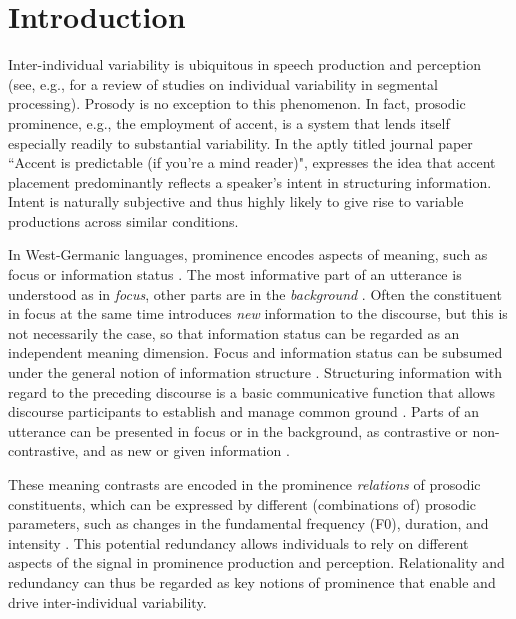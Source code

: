 \chapter{Introduction}

Inter-individual variability is ubiquitous in speech production and perception (see, e.g., \citealt{yuIndividualDifferencesLanguage2019} for a review of studies on individual variability in segmental processing). Prosody is no exception to this phenomenon. In fact, prosodic prominence, e.g., the employment of accent, is a system that lends itself especially readily to substantial variability. In the aptly titled journal paper ``Accent is predictable (if you're a mind reader)", \citet{bolingerAccentPredictableIf1972} expresses the idea that accent placement predominantly reflects a speaker's intent in structuring information.
Intent is naturally subjective and thus highly likely to give rise to variable productions across similar conditions. 
 
In West-Germanic languages, prominence encodes aspects of meaning, such as focus or information status \citep{buringSemanticsIntonationInformation2007, feryPitchAccentScaling2008, baumannCoreferenceLexicalGivenness2013, coleProsodyContextReview2015}. The most informative part of an utterance is understood as in \textit{focus}, other parts are in the \textit{background} \citep{buringSemanticsIntonationInformation2007}. Often the constituent in focus at the same time introduces \textit{new} information to the discourse, but this is not necessarily the case, so that information status can be regarded as an independent meaning dimension. Focus and information status can be subsumed under the general notion of information structure \citep{hallidayNotesTransitivityTheme1967}. Structuring information with regard to the preceding discourse is a basic communicative function that allows discourse participants to establish and manage common ground \citep{krifkaBasicNotionsInformation2008}. Parts of an utterance can be presented in focus or in the background, as contrastive or non-contrastive, and as new or given information \citep{buringSemanticsIntonationInformation2007}.

These meaning contrasts are encoded in the prominence \textit{relations} of prosodic constituents, which can be expressed by different (combinations of) prosodic parameters, such as changes in the fundamental frequency (F0), duration, and intensity \citep{fryDurationIntensityPhysical1955, sluijterSpectralBalanceAcoustic1996, kochanskiLoudnessPredictsProminence2005, baumannWhatMakesWord2018, roessigTracingPhoneticSpace2022}.
This potential redundancy allows individuals to rely on different aspects of the signal in prominence production and perception.
Relationality and redundancy can thus be regarded as key notions of prominence that enable and drive inter-individual variability.

